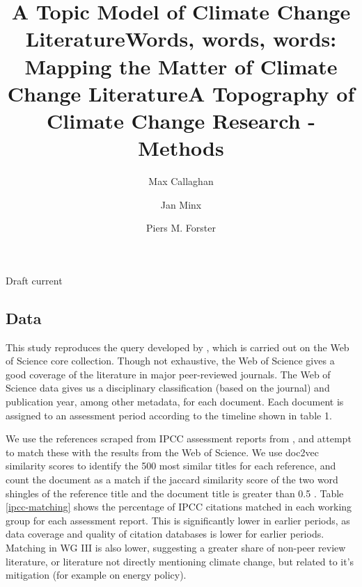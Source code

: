 \documentclass{article}
\makeatletter
\renewcommand{\maketitle}{\bgroup\setlength{\parindent}{0pt}
	\begin{flushleft}
		
		{\huge\textbf{\@title}}
		
		\bigskip
		
		{\large\textbf{\@author}}
		
		\bigskip
		
		{\large{Draft current \@date}}
		
	\end{flushleft}\egroup
}
\makeatother
\begin{document}
	\title{A Topic Model of Climate Change Literature}
	\title{Words, words, words: Mapping the Matter of Climate Change Literature}
	\title{A Topography of Climate Change Research - Methods}
	\author[1,2]{Max Callaghan}
	\author[1,2]{Jan Minx}
	\author[2]{Piers M. Forster}
	
	
	\maketitle
	\begin{linenumbers}
	
	\setcounter{figure}{0}
	\renewcommand\thefigure{SI.\arabic{figure}}  
		
	\subsection*{Data}
	
	This study reproduces the query developed by \citep{Grieneisen2011}, which is carried out on the Web of Science core collection. Though not exhaustive, the Web of Science gives a good coverage of the literature in major peer-reviewed journals. The Web of Science data gives us a disciplinary classification (based on the journal) and publication year, among other metadata, for each document.	Each document is assigned to an assessment period according to the timeline shown in table 1.
	
	We use the references scraped from IPCC assessment reports from \citep{Minx2017l}, and attempt to match these with the results from the Web of Science. We use doc2vec similarity scores \cite{Le2014} to identify the 500 most similar titles for each reference, and count the document as a match if the jaccard similarity score of the two word shingles of the reference title and the document title is greater than 0.5 \cite{Khabsa2014}. Table \ref{ipcc-matching} shows the percentage of IPCC citations matched in each working group for each assessment report. This is significantly lower in earlier periods, as data coverage and quality of citation databases is lower for earlier periods. Matching in WG III is also lower, suggesting a greater share of non-peer review literature, or literature not directly mentioning climate change, but related to it's mitigation (for example on energy policy).
	

\end{linenumbers}
\end{document}
